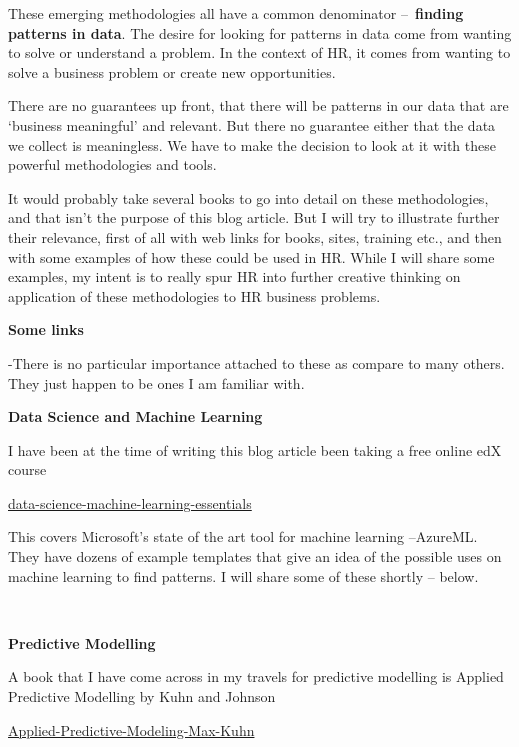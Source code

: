\documentclass[
]{article}
\begin{document}
These emerging methodologies all have a common denominator
--~\textbf{finding patterns in data}. The desire for looking for
patterns in data come from wanting to solve or understand a problem. In
the context of HR, it comes from wanting to solve a business problem or
create new opportunities.

There are no guarantees up front, that there will be patterns in our
data that are `business meaningful' and relevant. But there no guarantee
either that the data we collect is meaningless. We have to make the
decision to look at it with these powerful methodologies and tools.

It would probably take several books to go into detail on these
methodologies, and that isn't the purpose of this blog article. But I
will try to illustrate further their relevance, first of all with web
links for books, sites, training etc., and then with some examples of
how these could be used in HR. While I will share some examples, my
intent is to really spur HR into further creative thinking on
application of these methodologies to HR business problems.

\textbf{Some links}

-There is no particular importance attached to these as compare to many
others. They just happen to be ones I am familiar with.

\textbf{Data Science and Machine Learning}

I have been at the time of writing this blog article been taking a free
online edX course

\href{https://www.edx.org/course/data-science-machine-learning-essentials-microsoft-dat203x}{data-science-machine-learning-essentials}

This covers Microsoft's state of the art tool for machine learning
--AzureML. They have dozens of example templates that give an idea of
the possible uses on machine learning to find patterns. I will share
some of these shortly -- below.

~

\textbf{Predictive Modelling}

A book that I have come across in my travels for predictive modelling is
Applied Predictive Modelling by Kuhn and Johnson

\href{http://www.amazon.ca/Applied-Predictive-Modeling-Max-Kuhn/dp/1461468485/ref=sr_1_1?s=books&ie=UTF8&qid=1445460069&sr=1-1&keywords=applied+predictive+modeling}{Applied-Predictive-Modeling-Max-Kuhn}

~
\end{document}
